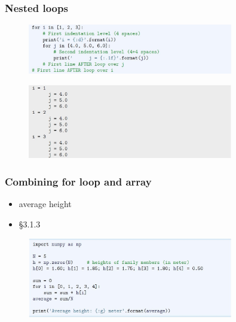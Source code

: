 \documentclass[english,14pt]{beamer}
\begin{document}
\begin{frame}[fragile]

\frametitle{Nested loops}

%

\begin{figure}[ht]
	\centering
	\includegraphics[width=0.8\textwidth]{figures/LLp61a}
\end{figure}

\begin{figure}[ht]
	\centering
	\includegraphics[width=0.8\textwidth]{figures/LLp61b}
\end{figure}

\end{frame}


\begin{frame}[fragile]

\frametitle{Combining for loop and array}

\begin{itemize}
	\item average height
	\item \S3.1.3
\end{itemize}

\begin{figure}[ht]
	\centering
	\includegraphics[width=0.8\textwidth]{figures/LLp62a}
\end{figure}

\end{frame}
\end{document}
